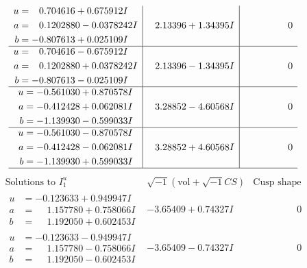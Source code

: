 \documentclass[1p]{elsarticle_modified}
\theoremstyle{definition}
\newcommand{\I}{\sqrt{-1}}
\begin{document}
$$\begin{array}{c|c|c}
\begin{aligned}
u &= \phantom{-}0.704616 + 0.675912 I \\
a &= \phantom{-}0.1202880 - 0.0378242 I \\
b &= -0.807613 + 0.025109 I\end{aligned}
 & \phantom{-}2.13396 + 1.34395 I & \phantom{-0.000000 } 0 \\ \hline\begin{aligned}
u &= \phantom{-}0.704616 - 0.675912 I \\
a &= \phantom{-}0.1202880 + 0.0378242 I \\
b &= -0.807613 - 0.025109 I\end{aligned}
 & \phantom{-}2.13396 - 1.34395 I & \phantom{-0.000000 } 0 \\ \hline\begin{aligned}
u &= -0.561030 + 0.870578 I \\
a &= -0.412428 + 0.062081 I \\
b &= -1.139930 - 0.599033 I\end{aligned}
 & \phantom{-}3.28852 - 4.60568 I & \phantom{-0.000000 } 0 \\ \hline\begin{aligned}
u &= -0.561030 - 0.870578 I \\
a &= -0.412428 - 0.062081 I \\
b &= -1.139930 + 0.599033 I\end{aligned}
 & \phantom{-}3.28852 + 4.60568 I & \phantom{-0.000000 } 0\\
 \hline 
 \end{array}$$\newpage$$\begin{array}{c|c|c}  
\text{Solutions to }I^u_{1}& \I (\text{vol} + \sqrt{-1}CS) & \text{Cusp shape}\\
 \hline 
\begin{aligned}
u &= -0.123633 + 0.949947 I \\
a &= \phantom{-}1.157780 + 0.758066 I \\
b &= \phantom{-}1.192050 + 0.602453 I\end{aligned}
 & -3.65409 + 0.74327 I & \phantom{-0.000000 } 0 \\ \hline\begin{aligned}
u &= -0.123633 - 0.949947 I \\
a &= \phantom{-}1.157780 - 0.758066 I \\
b &= \phantom{-}1.192050 - 0.602453 I\end{aligned}
 & -3.65409 - 0.74327 I & \phantom{-0.000000 } 0 \\ \hline\begin{aligned}

\end{aligned}
\end{array}$$
\end{document}
